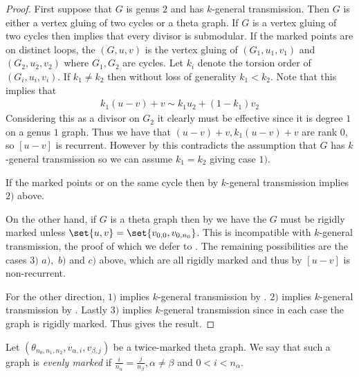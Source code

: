\begin{proof}
    First suppose that $G$ is genus $2$ and has $k$-general transmission. Then $G$ is either a vertex gluing of two cycles or a theta graph. If $G$ is a vertex gluing of two cycles then \cite[Lemma 2.5, Theorem 3.11]{Pfl22} implies that every divisor is submodular. If the marked points are on distinct loops, the $(G,u,v)$ is the vertex gluing of $(G_1,u_1,v_1)$ and $(G_2,u_2,v_2)$ where $G_1,G_2$ are cycles. Let $k_i$ denote the torsion order of $(G_i,u_i,v_i)$. If $k_1 \neq k_2$ then without loss of generality $k_1<k_2$. Note that this implies that
    \begin{align*}
        k_1(u-v)+v \sim k_1u_2 + (1-k_1)v_2
    \end{align*}
    Considering this as a divisor on $G_2$ it clearly must be effective since it is degree $1$ on a genus $1$ graph. Thus we have that $(u-v)+v, k_1(u-v)+v$ are rank $0$, so $[u-v]$ is recurrent. However by  this contradicts the assumption that $G$ has $k$-general transmission so we can assume $k_1 = k_2$ giving case $1)$.

    If the marked points or on the same cycle then by  $k$-general transmission implies $2)$ above.
    
    On the other hand, if $G$ is a theta graph then by  we have the $G$ must be rigidly marked unless $\set{u,v} = \set{v_{0,0},v_{0,n_0}}$. This is incompatible with $k$-general transmission, the proof of which we defer to . The remaining possibilities are the cases $3)$ $ a),$ $b)$ and $c)$ above, which are all rigidly marked and thus by  $[u-v]$ is non-recurrent.

    For the other direction, $1)$ implies $k$-general transmission by \cite[Theorem A]{Pfl22}. $2)$ implies $k$-general transmission by . Lastly $3)$ implies $k$-general transmission since in each case the graph is rigidly marked. Thus  gives the result.
\end{proof}

\begin{defi}\label{defn:evenlyMarked}
    Let $(\theta_{n_0,n_1,n_2},v_{\alpha,i},v_{\beta,j})$ be a twice-marked theta graph. We say that such a graph is \textit{evenly marked} if $\frac{i}{n_\alpha} = \frac{j}{n_\beta}, \alpha \neq \beta$ and $0<i<n_\alpha$.
\end{defi}


